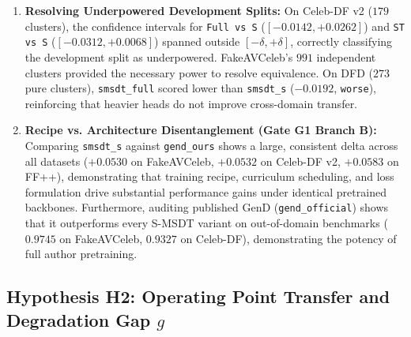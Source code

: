 \begin{enumerate}[leftmargin=*]
    \paragraph{Seed Variance and Scope Caveat.}
    We note that these cluster-bootstrap confidence intervals resample test clusters only, reflecting test-set sampling uncertainty rather than training-seed variance. The seed-to-seed standard deviation of \texttt{smsdt\_st} on FakeAVCeleb is $\sigma_{\text{seed}} = 0.0080$, which is comparable to the equivalence margin $\delta = 0.01$. Across individual training seeds, the paired differences for \texttt{ST - S} are $-0.0152$ (seed 1, slightly outside $[-\delta, +\delta]$), $+0.0037$ (seed 2), and $-0.0021$ (seed 3); for \texttt{Full - S}, they are $-0.0009$, $-0.0005$, and $+0.0050$. Equivalence is therefore formally established for the pooled evaluation across this benchmark ($83.4\%$ fake prevalence, VoxCeleb2 source reals, 5 manipulation algorithms).
    \item \textbf{Resolving Underpowered Development Splits:} On Celeb-DF v2 ($179$ clusters), the confidence intervals for \texttt{Full vs S} ($[-0.0142, +0.0262]$) and \texttt{ST vs S} ($[-0.0312, +0.0068]$) spanned outside $[-\delta, +\delta]$, correctly classifying the development split as underpowered. FakeAVCeleb's $991$ independent clusters provided the necessary power to resolve equivalence. On DFD ($273$ pure clusters), \texttt{smsdt\_full} scored lower than \texttt{smsdt\_s} ($-0.0192$, \texttt{worse}), reinforcing that heavier heads do not improve cross-domain transfer.
    \item \textbf{Recipe vs. Architecture Disentanglement (Gate G1 Branch B):} Comparing \texttt{smsdt\_s} against \texttt{gend\_ours} shows a large, consistent delta across all datasets ($+0.0530$ on FakeAVCeleb, $+0.0532$ on Celeb-DF v2, $+0.0583$ on FF++), demonstrating that training recipe, curriculum scheduling, and loss formulation drive substantial performance gains under identical pretrained backbones. Furthermore, auditing published GenD (\texttt{gend\_official}) shows that it outperforms every S-MSDT variant on out-of-domain benchmarks ($0.9745$ on FakeAVCeleb, $0.9327$ on Celeb-DF), demonstrating the potency of full author pretraining.
\end{enumerate}

\subsection{Hypothesis H2: Operating Point Transfer and Degradation Gap $g$}
